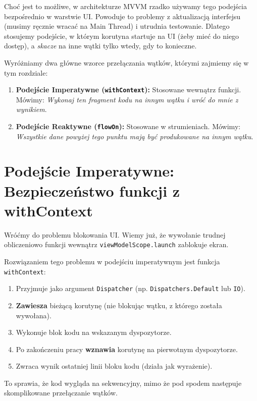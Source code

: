 Choć jest to możliwe, w architekturze MVVM rzadko używamy tego podejścia bezpośrednio w warstwie UI. Powoduje to problemy z aktualizacją interfejsu (musimy ręcznie wracać na Main Thread) i utrudnia testowanie. Dlatego stosujemy podejście, w którym korutyna startuje na UI (żeby mieć do niego dostęp), a \textit{skacze} na inne wątki tylko wtedy, gdy to konieczne.

Wyróżniamy dwa główne wzorce przełączania wątków, którymi zajmiemy się w tym rozdziale:

\begin{enumerate}
    \item \textbf{Podejście Imperatywne (\texttt{withContext}):} Stosowane wewnątrz funkcji. Mówimy: \textit{Wykonaj ten fragment kodu na innym wątku i wróć do mnie z wynikiem}.
    \item \textbf{Podejście Reaktywne (\texttt{flowOn}):} Stosowane w strumieniach. Mówimy: \textit{Wszystkie dane powyżej tego punktu mają być produkowane na innym wątku}.
\end{enumerate}

\section{Podejście Imperatywne: Bezpieczeństwo funkcji z withContext}

Wróćmy do problemu blokowania UI. Wiemy już, że wywołanie trudnej obliczeniowo funkcji wewnątrz \texttt{viewModelScope.launch} zablokuje ekran.

Rozwiązaniem tego problemu w podejściu imperatywnym jest funkcja \texttt{withContext}:
\begin{enumerate}
    \item Przyjmuje jako argument \texttt{Dispatcher} (np. \texttt{Dispatchers.Default} lub \texttt{IO}).
    \item \textbf{Zawiesza} bieżącą korutynę (nie blokując wątku, z którego została wywołana).
    \item Wykonuje blok kodu na wskazanym dyspozytorze.
    \item Po zakończeniu pracy \textbf{wznawia} korutynę na pierwotnym dyspozytorze.
    \item Zwraca wynik ostatniej linii bloku kodu (działa jak wyrażenie).
\end{enumerate}

To sprawia, że kod wygląda na sekwencyjny, mimo że pod spodem następuje skomplikowane przełączanie wątków.

